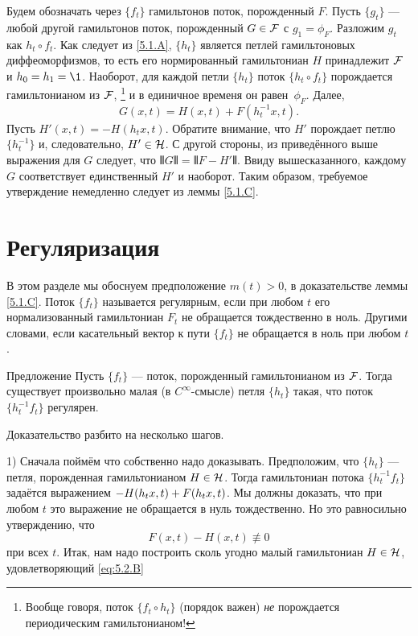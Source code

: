 Будем обозначать через $\{f_t\}$ гамильтонов поток, порожденный $F$.
Пусть $\{g_t\}$ — любой другой гамильтонов поток, порожденный $G \in \mathcal{F}$ с $g_1 = \phi_F$.
Разложим $g_t$ как $h_t \circ f_t$.
Как следует из \ref{5.1.A}, $\{h_t\}$ является петлей гамильтоновых диффеоморфизмов, то есть его нормированный гамильтониан $H$ принадлежит $\mathcal{F}$ и $h_0 = h_1 = \1$.
Наоборот, для каждой петли $\{h_t\}$ поток $\{h_t \circ f_t\}$ порождается гамильтонианом из $\mathcal{F}$,%
\footnote{Вообще говоря, поток $\{f_t \circ h_t\}$ (порядок важен) {}\emph{не} порождается периодическим гамильтонианом!}
и в единичное временя он равен~$\phi_F$.
Далее, 
\[G (x, t) = H (x, t) + F (h^{-1}_t x, t).\]
Пусть $H' (x, t) = -H (h_t x, t)$.
Обратите внимание, что $H'$ порождает петлю $\{h^{-1}_t\}$ и, следовательно, $H'\in\mathcal{H}$.
С другой стороны, из приведённого выше выражения для $G$ следует, что $\VERT G \VERT = \VERT F - H' \VERT$.
Ввиду вышесказанного, каждому $G$ соответствует единственный $H'$ и наоборот.
Таким образом, требуемое утверждение немедленно следует из леммы \ref{5.1.C}.
\qeds

\section{Регуляризация}\label{5.2}

В этом разделе мы обоснуем предположение $m(t)>0$, в доказательстве леммы \ref{5.1.C}.
Поток $\{f_t\}$ называется регулярным, если при любом $t$ его нормализованный гамильтониан $F_t$ не обращается тождественно в ноль.
Другими словами, если касательный вектор к пути $\{f_t\}$ не обращается в ноль при любом $t$.

\begin{thm}{Предложение}\label{5.2.A}
Пусть $\{f_t\}$ — поток, порожденный гамильтонианом из $\mathcal{F}$.
Тогда существует произвольно малая (в $C^\infty$-смысле) петля $\{h_t\}$ такая, что поток $\{h^{-1}_t f_t\}$ регулярен.
\end{thm}

Доказательство разбито на несколько шагов.

1) Сначала поймём что собственно надо доказывать.
Предположим, что $\{h_t\}$ — петля, порожденная гамильтонианом $H \in \mathcal{H}$.
Тогда гамильтониан потока $\{h^{-1}_t f_t\}$ задаётся выражением $-H (h_t x, t) \z+ F (h_t x, t)$.
Мы должны доказать, что при любом $t$ это выражение не обращается в нуль тождественно.
Но это равносильно утверждению, что
\begin{equation}
F (x, t) - H (x, t) \not\equiv 0\label{eq:5.2.B}
\end{equation}
при всех $t$.
Итак, нам надо построить сколь угодно малый гамильтониан $H \in \mathcal{H}$, удовлетворяющий \ref{eq:5.2.B}

